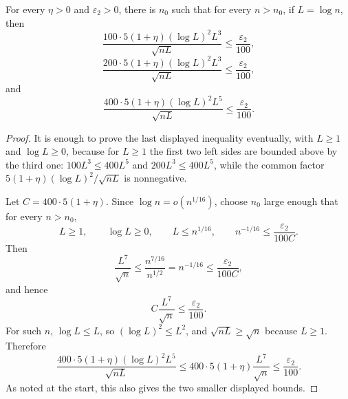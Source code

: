 \begin{helper}
For every \(\eta>0\) and \(\varepsilon_2>0\), there is \(n_0\) such that
for every \(n>n_0\), if \(L=\log n\), then
\[
\frac{100\cdot5(1+\eta)(\log L)^2L^3}{\sqrt{nL}}
\le\frac{\varepsilon_2}{100},
\]
\[
\frac{200\cdot5(1+\eta)(\log L)^2L^3}{\sqrt{nL}}
\le\frac{\varepsilon_2}{100},
\]
and
\[
\frac{400\cdot5(1+\eta)(\log L)^2L^5}{\sqrt{nL}}
\le\frac{\varepsilon_2}{100}.
\]
\end{helper}
\begin{proof}
It is enough to prove the last displayed inequality eventually, with
\(L\ge1\) and \(\log L\ge0\), because for \(L\ge1\) the first two left
sides are bounded above by the third one: \(100L^3\le400L^5\) and
\(200L^3\le400L^5\), while the common factor
\(5(1+\eta)(\log L)^2/\sqrt{nL}\) is nonnegative.

Let \(C=400\cdot5(1+\eta)\).  Since \(\log n=o(n^{1/16})\), choose
\(n_0\) large enough that for every \(n>n_0\),
\[
L\ge1,\qquad \log L\ge0,\qquad L\le n^{1/16},
\qquad n^{-1/16}\le\frac{\varepsilon_2}{100C}.
\]
Then
\[
\frac{L^7}{\sqrt n}
\le \frac{n^{7/16}}{n^{1/2}}
=n^{-1/16}
\le\frac{\varepsilon_2}{100C},
\]
and hence
\[
C\frac{L^7}{\sqrt n}\le\frac{\varepsilon_2}{100}.
\]
For such \(n\), \(\log L\le L\), so \((\log L)^2\le L^2\), and
\(\sqrt{nL}\ge\sqrt n\) because \(L\ge1\).  Therefore
\[
\frac{400\cdot5(1+\eta)(\log L)^2L^5}{\sqrt{nL}}
\le
400\cdot5(1+\eta)\frac{L^7}{\sqrt n}
\le\frac{\varepsilon_2}{100}.
\]
As noted at the start, this also gives the two smaller displayed bounds.
\end{proof}
